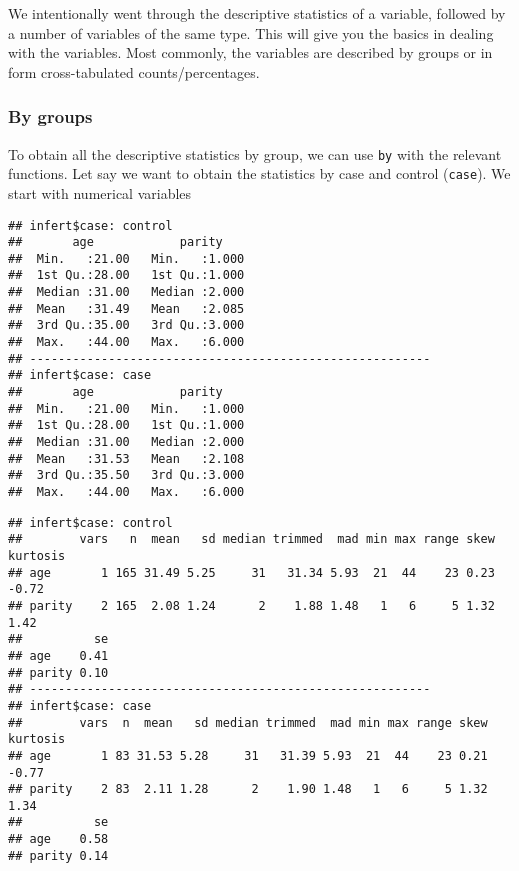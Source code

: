 \documentclass[]{book}
\newenvironment{Shaded}{\begin{snugshade}}{\end{snugshade}}
\newcommand{\KeywordTok}[1]{\textcolor[rgb]{0.13,0.29,0.53}{\textbf{{#1}}}}
\newcommand{\StringTok}[1]{\textcolor[rgb]{0.31,0.60,0.02}{{#1}}}
\newcommand{\NormalTok}[1]{{#1}}
\theoremstyle{definition}
\theoremstyle{definition}
\theoremstyle{remark}
\begin{document}
We intentionally went through the descriptive statistics of a variable,
followed by a number of variables of the same type. This will give you
the basics in dealing with the variables. Most commonly, the variables
are described by groups or in form cross-tabulated counts/percentages.

\subsubsection{By groups}\label{by-groups}

To obtain all the descriptive statistics by group, we can use
\texttt{by} with the relevant functions. Let say we want to obtain the
statistics by case and control (\texttt{case}). We start with numerical
variables

\begin{Shaded}
\end{Shaded}

\begin{verbatim}
## infert$case: control
##       age            parity     
##  Min.   :21.00   Min.   :1.000  
##  1st Qu.:28.00   1st Qu.:1.000  
##  Median :31.00   Median :2.000  
##  Mean   :31.49   Mean   :2.085  
##  3rd Qu.:35.00   3rd Qu.:3.000  
##  Max.   :44.00   Max.   :6.000  
## -------------------------------------------------------- 
## infert$case: case
##       age            parity     
##  Min.   :21.00   Min.   :1.000  
##  1st Qu.:28.00   1st Qu.:1.000  
##  Median :31.00   Median :2.000  
##  Mean   :31.53   Mean   :2.108  
##  3rd Qu.:35.50   3rd Qu.:3.000  
##  Max.   :44.00   Max.   :6.000
\end{verbatim}

\begin{Shaded}
\end{Shaded}

\begin{verbatim}
## infert$case: control
##        vars   n  mean   sd median trimmed  mad min max range skew kurtosis
## age       1 165 31.49 5.25     31   31.34 5.93  21  44    23 0.23    -0.72
## parity    2 165  2.08 1.24      2    1.88 1.48   1   6     5 1.32     1.42
##          se
## age    0.41
## parity 0.10
## -------------------------------------------------------- 
## infert$case: case
##        vars  n  mean   sd median trimmed  mad min max range skew kurtosis
## age       1 83 31.53 5.28     31   31.39 5.93  21  44    23 0.21    -0.77
## parity    2 83  2.11 1.28      2    1.90 1.48   1   6     5 1.32     1.34
##          se
## age    0.58
## parity 0.14
\end{verbatim}
\end{document}

